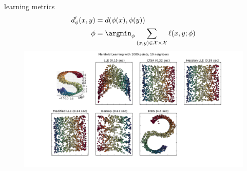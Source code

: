 \begin{frame}[fragile]{learning metrics}
\begin{align*}
d'_\phi(x,y) & = d(\phi(x),\phi(y))\\
\phi &= \argmin_{\phi} \sum_{(x,y) \in \mathcal X \times \mathcal X} \ell(x,y;\phi)
\end{align*}
\hspace{-1.5cm}\includegraphics[height=6cm,width=15cm]{slides/covertree/manifold.png}
\end{frame}


